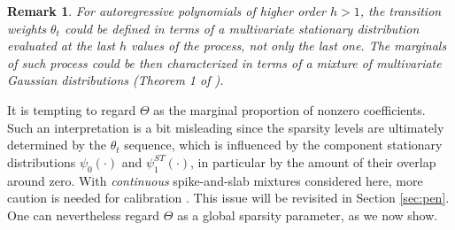 \documentclass[ba]{imsart}
\numberwithin{equation}{section}
\theoremstyle{plain}
\newtheorem{remark}{Remark}
\begin{document}
 \begin{remark}
For autoregressive polynomials of higher order $h>1$, the transition weights $\theta_t$ could be defined  in terms of a multivariate stationary distribution evaluated at the last $h$ values of the process, not only the last one. The marginals of such process could be then characterized in terms of a mixture of multivariate Gaussian distributions (Theorem 1 of  \cite{kalli}).
\end{remark}

{

It is tempting to regard $\Theta$ as the marginal proportion of nonzero coefficients. Such an interpretation is a bit misleading since
the sparsity levels are ultimately determined by the $\theta_t$ sequence, which is influenced by the component stationary distributions  $\psi_0(\cdot)$ and $\psi_1^{ST}(\cdot)$, in particular by the amount of their overlap around zero. 
With {\sl continuous} spike-and-slab mixtures considered here,  more caution is needed for calibration \citep{rockova15}. {This issue will be revisited  in Section \ref{sec:pen}}. One can nevertheless regard $\Theta$ as a global sparsity parameter, as we now show.

}
\end{document}
